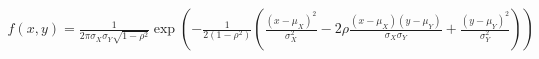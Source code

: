 \documentclass[preview]{standalone}
\begin{document}
\begin{align*}
f(x, y) = \frac{1}{2 \pi \sigma_X \sigma_Y \sqrt{1 - \rho^2}} \exp \left( -\frac{1}{2(1 - \rho^2)} \left( \frac{(x - \mu_X)^2}{\sigma_X^2} - 2 \rho \frac{(x - \mu_X)(y - \mu_Y)}{\sigma_X \sigma_Y} + \frac{(y - \mu_Y)^2}{\sigma_Y^2} \right) \right)
\end{align*}
\end{document}
